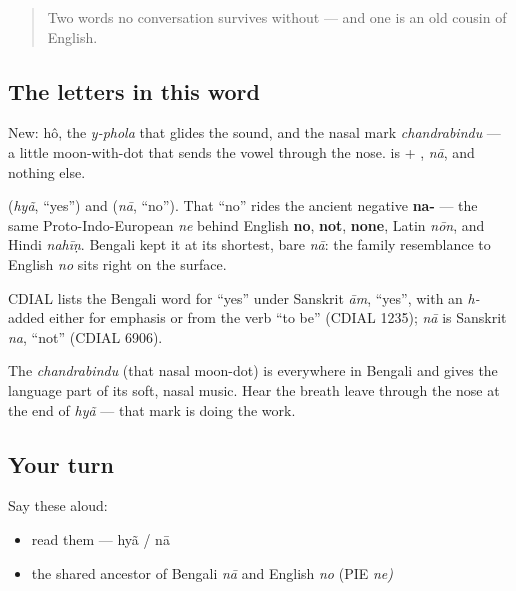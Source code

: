 \label{lesson:BN-C01-hyan-na}



\begin{quote}
Two words no conversation survives without — and one is an old cousin of English.
\end{quote}

\subsection*{The letters in this word}
New: \textbf{} hô, the \emph{y-phola} \textbf{} that glides the sound, and the nasal mark \emph{chandrabindu} \textbf{} — a little moon-with-dot that sends the vowel through the nose. \textbf{} is \textbf{} + \textbf{}, \emph{nā}, and nothing else.

\begin{cousinweb}
\textbf{} (\emph{hyã}, \textquotedblleft{}yes\textquotedblright{}) and \textbf{} (\emph{nā}, \textquotedblleft{}no\textquotedblright{}). That \textquotedblleft{}no\textquotedblright{} rides the ancient negative \textbf{na-} — the same Proto-Indo-European \emph{ne} behind English \textbf{no}, \textbf{not}, \textbf{none}, Latin \emph{nōn}, and Hindi \emph{nahīṇ}. Bengali kept it at its shortest, bare \emph{nā}: the family resemblance to English \emph{no} sits right on the surface.

CDIAL lists the Bengali word for \textquotedblleft{}yes\textquotedblright{} under Sanskrit \emph{ām}, \textquotedblleft{}yes\textquotedblright{}, with an \emph{h-} added either for emphasis or from the verb \textquotedblleft{}to be\textquotedblright{} (CDIAL 1235); \emph{nā} is Sanskrit \emph{na}, \textquotedblleft{}not\textquotedblright{} (CDIAL 6906).
\end{cousinweb}

\begin{culture}
The \emph{chandrabindu} (that nasal moon-dot) is everywhere in Bengali and gives the language part of its soft, nasal music. Hear the breath leave through the nose at the end of \emph{hyã} — that mark is doing the work.
\end{culture}

\subsection*{Your turn}
Say these aloud:

\begin{itemize}
\raggedright
  \item read them — hyã / nā
  \item the shared ancestor of Bengali \emph{nā} and English \emph{no} (PIE \emph{ne)}
\end{itemize}

